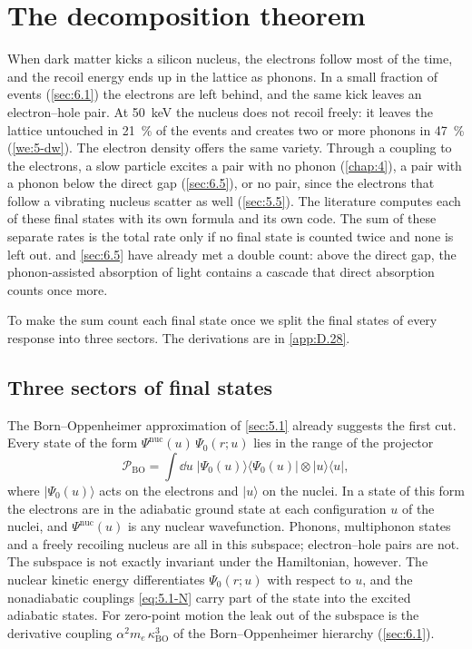 \section{The decomposition theorem}\label{sec:8.6}

When dark matter kicks a silicon nucleus, the electrons follow most of the time, and the recoil energy ends up in the lattice as phonons. In a small fraction of events (\cref{sec:6.1}) the electrons are left behind, and the same kick leaves an electron--hole pair. At \SI{50}{keV} the nucleus does not recoil freely: it leaves the lattice untouched in \SI{21}{\percent} of the events and creates two or more phonons in \SI{47}{\percent} (\cref{we:5-dw}). The electron density offers the same variety. Through a coupling to the electrons, a slow particle excites a pair with no phonon (\cref{chap:4}), a pair with a phonon below the direct gap (\cref{sec:6.5}), or no pair, since the electrons that follow a vibrating nucleus scatter as well (\cref{sec:5.5}). The literature computes each of these final states with its own formula and its own code. The sum of these separate rates is the total rate only if no final state is counted twice and none is left out.  and \cref{sec:6.5} have already met a double count: above the direct gap, the phonon-assisted absorption of light contains a cascade that direct absorption counts once more.

To make the sum count each final state once we split the final states of every response into three sectors. The derivations are in \cref{app:D.28}.

\subsection{Three sectors of final states}

The Born--Oppenheimer approximation of \cref{sec:5.1} already suggests the first cut. Every state of the form $\Psi^{\mathrm{nuc}}(u)\,\Psi_0(r;u)$ lies in the range of the projector
\begin{equation}
  \mathcal{P}_{\mathrm{BO}} = \int\dd u\;|\Psi_0(u)\rangle\langle\Psi_0(u)|\otimes|u\rangle\langle u| ,
  \label{eq:8.6-PBO}
\end{equation}
where $|\Psi_0(u)\rangle$ acts on the electrons and $|u\rangle$ on the nuclei. In a state of this form the electrons are in the adiabatic ground state at each configuration $u$ of the nuclei, and $\Psi^{\mathrm{nuc}}(u)$ is any nuclear wavefunction. Phonons, multiphonon states and a freely recoiling nucleus are all in this subspace; electron--hole pairs are not. The subspace is not exactly invariant under the Hamiltonian, however. The nuclear kinetic energy differentiates $\Psi_0(r;u)$ with respect to $u$, and the nonadiabatic couplings \cref{eq:5.1-N} carry part of the state into the excited adiabatic states. For zero-point motion the leak out of the subspace is the derivative coupling $\alpha^2m_e\,\kappa_{\mathrm{BO}}^3$ of the Born--Oppenheimer hierarchy (\cref{sec:6.1}).

